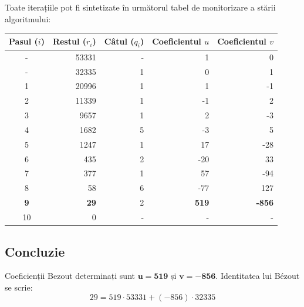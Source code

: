 \documentclass[12pt]{article}
\begin{document}
Toate iterațiile pot fi sintetizate în următorul tabel de monitorizare a stării algoritmului:

\begin{center}
\begin{tabular}{crrrr}
\toprule
\textbf{Pasul ($i$)} & \textbf{Restul ($r_i$)} & \textbf{Câtul ($q_i$)} & \textbf{Coeficientul $u$} & \textbf{Coeficientul $v$} \\
\midrule
- & 53331 & - & 1 & 0 \\
- & 32335 & 1 & 0 & 1 \\
1 & 20996 & 1 & 1 & -1 \\
2 & 11339 & 1 & -1 & 2 \\
3 & 9657 & 1 & 2 & -3 \\
4 & 1682 & 5 & -3 & 5 \\
5 & 1247 & 1 & 17 & -28 \\
6 & 435 & 2 & -20 & 33 \\
7 & 377 & 1 & 57 & -94 \\
8 & 58 & 6 & -77 & 127 \\
\textbf{9} & \textbf{29} & 2 & \textbf{519} & \textbf{-856} \\
10 & 0 & - & - & - \\
\bottomrule
\end{tabular}
\end{center}

\subsection*{Concluzie }
Coeficienții Bezout determinați sunt $\mathbf{u = 519}$ și $\mathbf{v = -856}$. Identitatea lui Bézout se scrie:
\[
29 = 519 \cdot 53331 + (-856) \cdot 32335
\]
\end{document}

